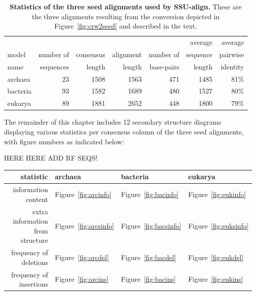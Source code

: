 \begin{table}
\begin{center}
\begin{tabular}{lrrrrrr} \hline
        &           &           &           &           & average   & average  \\
model   & number of & consensus & alignment & number of & sequence  & pairwise \\
name    & sequences & length    & length    & base-pairs & length    & identity \\ \hline
archaea & 23        & 1508      & 1563      & 471       & 1485      & 81\%     \\
bacteria& 93        & 1582      & 1689      & 480       & 1527      & 80\%     \\
eukarya  & 89       & 1881      & 2652      & 448       & 1800      & 79\%     \\ 
\end{tabular}
\caption[Statistics of the three seed alignments used by SSU-align.]
{\textbf{Statistics of the three seed alignments used by
    SSU-align.} These are the three alignments resulting from the
     conversion depicted in Figure~\ref{fig:crw2seed} and
    described in the text.}
\label{tbl:finalseeds}
\end{center}
\end{table}

The remainder of this chapter includes 12 secondary structure diagrams
displaying various statistics per consensus column of the three seed
alignments, with figure numbers as indicated below:

\vspace{0.2in}

HERE HERE ADD RF SEQS!

\begin{tabular}{r|l|l|l} \hline
statistic                        & archaea & bacteria & eukarya \\ \hline
information content              & Figure~\ref{fig:arcinfo} & Figure~\ref{fig:bacinfo} & Figure~\ref{fig:eukinfo} \\ 
extra information from structure & Figure~\ref{fig:arcsinfo} & Figure~\ref{fig:bacsinfo} & Figure~\ref{fig:euksinfo} \\ 
frequency of deletions           & Figure~\ref{fig:arcdel} & Figure~\ref{fig:bacdel} & Figure~\ref{fig:eukdel} \\ 
frequency of insertions          & Figure~\ref{fig:arcins} & Figure~\ref{fig:bacins} & Figure~\ref{fig:eukins} \\ 
\end{tabular}

